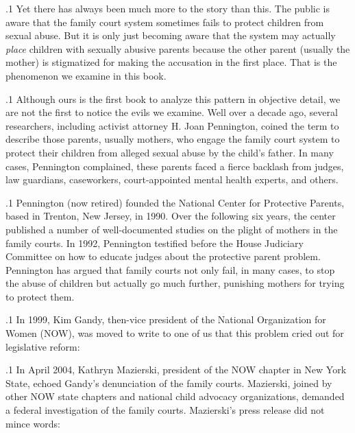 \documentclass[11pt, twoside]{article}
\begin{document}
{\p.1{%
Yet there has always been much more to the story than this. The public
is aware that the family court system sometimes fails to protect children
from sexual abuse. But it is only just becoming aware that the system
may actually \textit{place} children with sexually abusive parents because the
other parent (usually the mother) is stigmatized for making the accusation in the first place. That is the phenomenon we examine in this
book.
}%

\p.1{%
Although ours is the first book to analyze this pattern in objective detail, we are not the first to notice the evils we examine. Well over a decade
ago, several researchers, including activist attorney H. Joan Pennington,
coined the term  to describe those parents, usually
mothers, who engage the family court system to protect their children
from alleged sexual abuse by the child’s father. In many cases, Pennington complained, these parents faced a fierce backlash from judges,
law guardians, caseworkers, court-appointed mental health experts, and
others.
}%

\p.1{%
Pennington (now retired) founded the National Center for Protective Parents, based in Trenton, New Jersey, in 1990. Over the following
six years, the center published a number of well-documented studies
on the plight of mothers in the family courts. In 1992, Pennington testified before the House Judiciary Committee on how to educate judges
about the protective parent problem. Pennington has argued that family courts not only fail, in many cases, to stop the abuse of children but
actually go much further, punishing mothers for trying to protect
them.
}%

\p.1{%
In 1999, Kim Gandy, then-vice president of the National Organization for Women (NOW), was moved to write to one of us that this
problem cried out for legislative reform: 
}%

\p.1{%
In April 2004, Kathryn Mazierski, president of the NOW chapter
in New York State, echoed Gandy’s denunciation of the family courts.
Mazierski, joined by other NOW state chapters and national child advocacy organizations, demanded a federal investigation of the family
courts. Mazierski’s press release did not mince words: 
}%

}
\end{document}

